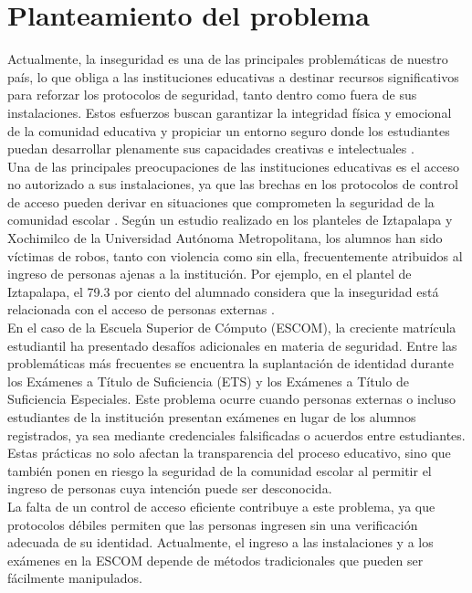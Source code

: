 
\section{Planteamiento del problema}

Actualmente, la inseguridad es una de las principales problemáticas de nuestro país, lo que obliga a las instituciones educativas a destinar recursos significativos para reforzar los protocolos de seguridad, tanto dentro como fuera de sus instalaciones. Estos esfuerzos buscan garantizar la integridad física y emocional de la comunidad educativa y propiciar un entorno seguro donde los estudiantes puedan desarrollar plenamente sus capacidades creativas e intelectuales \cite{L03}.\\

Una de las principales preocupaciones de las instituciones educativas es el acceso no autorizado a sus instalaciones, ya que las brechas en los protocolos de control de acceso pueden derivar en situaciones que comprometen la seguridad de la comunidad escolar \cite{L04}. Según un estudio realizado en los planteles de Iztapalapa y Xochimilco de la Universidad Autónoma Metropolitana, los alumnos han sido víctimas de robos, tanto con violencia como sin ella, frecuentemente atribuidos al ingreso de personas ajenas a la institución. Por ejemplo, en el plantel de Iztapalapa, el 79.3 por ciento del alumnado considera que la inseguridad está relacionada con el acceso de personas externas \cite{L05}.\\

En el caso de la Escuela Superior de Cómputo (ESCOM), la creciente matrícula estudiantil ha presentado desafíos adicionales en materia de seguridad. Entre las problemáticas más frecuentes se encuentra la suplantación de identidad durante los Exámenes a Título de Suficiencia (ETS) y los Exámenes a Título de Suficiencia Especiales. Este problema ocurre cuando personas externas o incluso estudiantes de la institución presentan exámenes en lugar de los alumnos registrados, ya sea mediante credenciales falsificadas o acuerdos entre estudiantes. Estas prácticas no solo afectan la transparencia del proceso educativo, sino que también ponen en riesgo la seguridad de la comunidad escolar al permitir el ingreso de personas cuya intención puede ser desconocida. \\

La falta de un control de acceso eficiente contribuye a este problema, ya que protocolos débiles permiten que las personas ingresen sin una verificación adecuada de su identidad. Actualmente, el ingreso a las instalaciones y a los exámenes en la ESCOM depende de métodos tradicionales que pueden ser fácilmente manipulados. \\